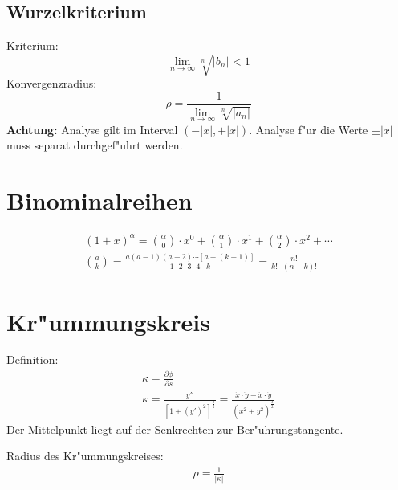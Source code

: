 \subsection{Wurzelkriterium}
Kriterium:
\begin{equation}
  \lim_{n\rightarrow\infty}\sqrt[n]{|b_n|} < 1
\end{equation}
Konvergenzradius:
\begin{equation}
  \rho = \frac{1}{\lim_{n\rightarrow\infty}\sqrt[n]{|a_n|}}
\end{equation}
\textbf{Achtung:} Analyse gilt im Interval $(-|x|, +|x|)$. Analyse f"ur
die Werte $\pm |x|$ muss separat durchgef"uhrt werden.


\section{Binominalreihen}
\begin{gather}
  {(1+x)}^\alpha = \binom{\alpha}{0}\cdot x^0 + \binom{\alpha}{1}\cdot x^1 + \binom{\alpha}{2}\cdot x^2 + \cdots \\
  \binom{a}{k} = \frac{a(a-1)(a-2)\cdots [a-(k-1)]}{1\cdot 2\cdot 3\cdot 4\cdots k} = \frac{n!}{k! \cdot (n-k)!}
\end{gather}

\section{Kr"ummungskreis}
Definition:
\begin{gather}
  \kappa = \frac{\partial\phi}{\partial s} \\
  \kappa = \frac{y''}{{\left[{1+{(y')}^2}\right]}^\frac{3}{2}}
	= \frac{\dot{x}\cdot\ddot{y}-\ddot{x}\cdot\dot{y}}{{\left({\dot{x^2}+\dot{y^2}}\right)}^\frac{3}{2}}
\end{gather}
Der Mittelpunkt liegt auf der Senkrechten zur Ber"uhrungstangente.

Radius des Kr"ummungskreises:
\begin{gather}
  \rho = \frac{1}{|\kappa |}
\end{gather}


